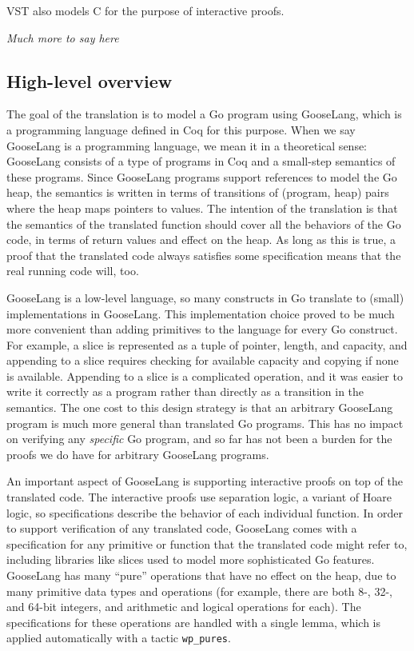 VST also models C for the purpose of interactive proofs.

\emph{Much more to say here}

\hypertarget{high-level-overview}{%
\subsection{High-level overview}\label{high-level-overview}}

The goal of the translation is to model a Go program using GooseLang,
which is a programming language defined in Coq for this purpose. When we
say GooseLang is a programming language, we mean it in a theoretical
sense: GooseLang consists of a type of programs in Coq and a small-step
semantics of these programs. Since GooseLang programs support references
to model the Go heap, the semantics is written in terms of transitions
of (program, heap) pairs where the heap maps pointers to values. The
intention of the translation is that the semantics of the translated
function should cover all the behaviors of the Go code, in terms of
return values and effect on the heap. As long as this is true, a proof
that the translated code always satisfies some specification means that
the real running code will, too.

GooseLang is a low-level language, so many constructs in Go translate to
(small) implementations in GooseLang. This implementation choice proved
to be much more convenient than adding primitives to the language for
every Go construct. For example, a slice is represented as a tuple of
pointer, length, and capacity, and appending to a slice requires
checking for available capacity and copying if none is available.
Appending to a slice is a complicated operation, and it was easier to
write it correctly as a program rather than directly as a transition in
the semantics. The one cost to this design strategy is that an arbitrary
GooseLang program is much more general than translated Go programs. This
has no impact on verifying any \emph{specific} Go program, and so far
has not been a burden for the proofs we do have for arbitrary GooseLang
programs.

An important aspect of GooseLang is supporting interactive proofs on top
of the translated code. The interactive proofs use separation logic, a
variant of Hoare logic, so specifications describe the behavior of each
individual function. In order to support verification of any translated
code, GooseLang comes with a specification for any primitive or function
that the translated code might refer to, including libraries like slices
used to model more sophisticated Go features. GooseLang has many
``pure'' operations that have no effect on the heap, due to many
primitive data types and operations (for example, there are both 8-,
32-, and 64-bit integers, and arithmetic and logical operations for
each). The specifications for these operations are handled with a single
lemma, which is applied automatically with a tactic \texttt{wp\_pures}.

